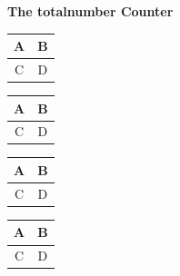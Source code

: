 \documentclass{article}
\begin{document}
	{\centering\Huge\bf The totalnumber Counter}
	\vspace{0.5cm}
	
	\begin{table}[t]
		\begin{tabular}{|c|c|}
			\hline A & B \\ \hline C & D \\ \hline
		\end{tabular}
	\end{table}
	\begin{table}[t]
		\begin{tabular}{|c|c|}
			\hline A & B \\ \hline C & D \\ \hline
		\end{tabular}
	\end{table}
	\begin{table}[h]
		\begin{tabular}{|c|c|}
			\hline A & B \\ \hline C & D \\ \hline
		\end{tabular}
	\end{table}
	
	\begin{table}[h]
		\begin{tabular}{|c|c|}
			\hline A & B \\ \hline C & D \\ \hline
		\end{tabular}
	\end{table}
	
\end{document}
